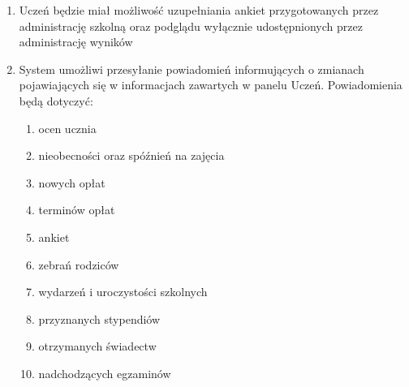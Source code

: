 \documentclass{article}
\begin{document}
\begin{enumerate}
	\item Uczeń będzie miał możliwość uzupełniania ankiet przygotowanych przez administrację szkolną oraz podglądu wyłącznie udostępnionych przez administrację wyników
	\item System umożliwi przesyłanie powiadomień informujących o zmianach pojawiających się w informacjach zawartych w panelu Uczeń. Powiadomienia będą dotyczyć:
	\begin{enumerate}
		\item ocen ucznia
		\item nieobecności oraz spóźnień na zajęcia
		\item nowych opłat
		\item terminów opłat 
		\item ankiet
		\item zebrań rodziców
		\item wydarzeń i uroczystości szkolnych
		\item przyznanych stypendiów
		\item otrzymanych świadectw
		\item nadchodzących egzaminów
	\end{enumerate}	
\end{enumerate}




\end{document}
